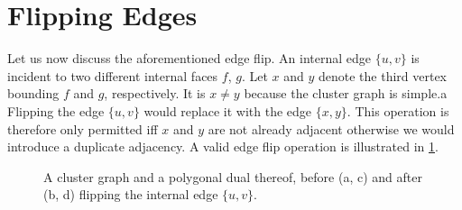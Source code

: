 \section{Flipping Edges}
\label{sect:flipping-edges}

Let us now discuss the aforementioned edge flip.
An internal edge $\{u,v\}$ is incident to two different internal faces $f$, $g$.
Let $x$ and $y$ denote the third vertex bounding $f$ and $g$, respectively.
It is $x \neq y$ because the cluster graph is simple.a
Flipping the edge $\{u,v\}$ would replace it with the edge $\{x,y\}$.
This operation is therefore only permitted iff $x$ and $y$ are not already adjacent \emdash{} otherwise we would introduce a duplicate adjacency.
A valid edge flip operation is illustrated in \cref{fig:flip-edge-example-internal}.

\begin{figure}[H]
	\centering
	\quad
	\qquad
	\quad
	\caption{A cluster graph and a polygonal dual thereof, before (a, c) and after (b, d) flipping the internal edge $\{u,v\}$.}
	\label{fig:flip-edge-example-internal}
\end{figure}

